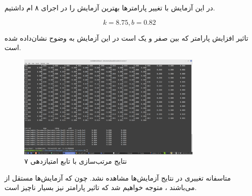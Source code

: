 \begin{boxM}
    در این آزمایش با تغییر پارامترها 
    بهترین آزمایش را در اجرای ۸ ام داشتیم.

    \begin{equation*}
        k=8.75  , b=0.82
    \end{equation*}

    تاثیر افزایش پارامتر
    که بین صفر  و یک است در این آزمایش به وضوح نشان‌داده شده است.
    
\end{boxM}

\newpage

\begin{figure}
    \centering
    \includegraphics[width=0.8\textwidth]{IR1/images/V7.png}
    \caption{نتایج مرتب‌سازی با تابع امتیازدهی ۷}
    \label{fig:enter-label}
\end{figure}

\begin{boxM}
    متاسفانه تغییری در نتایج آزمایش‌ها مشاهده نشد.
    چون که آزمایش‌ها مستقل از
    می‌باشند ، 
    متوجه خواهیم شد که تاثیر پارامتر
    نیز بسیار ناچیز است.
\end{boxM}
